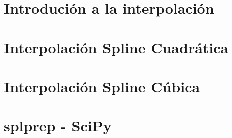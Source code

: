 \documentclass[12pt]{article}
\author{Vale Fernando Alexis}
\begin{document}
\section{Introdución a la interpolación}
  
\section{Interpolación Spline Cuadrática}
  
\section{Interpolación Spline Cúbica}
  
\section{splprep - SciPy}

\end{document}
